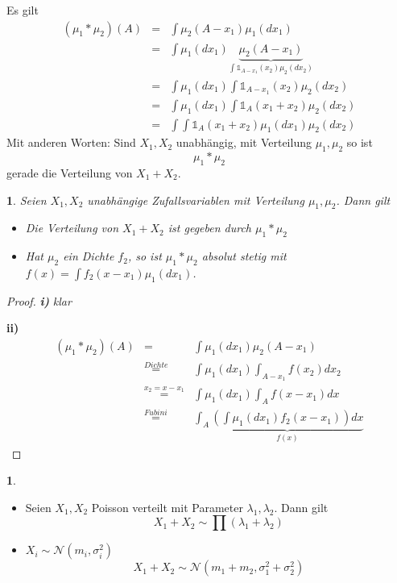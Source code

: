 \documentclass[10pt,a4paper]{report}
\numberwithin{equation}{section}
\numberwithin{figure}{section}
\theoremstyle{plain}
\theoremstyle{definition}
\newtheorem{example}[thm]{\protect\examplename}
\theoremstyle{remark}
\theoremstyle{plain}
\newtheorem{prop}[thm]{\protect\propositionname}
\providecommand{\examplename}{Beispiel}
\providecommand{\propositionname}{Satz}
\newcommand{\1}{ \mathbb{1} } %
\begin{document}
Es gilt
\begin{eqnarray*}
  \left(\mu_{1}*\mu_{2}\right)\left(A\right) & = & \int\mu_{2}\left(A-x_{1}\right)\mu_{1}\left(dx_{1}\right)\\
  & = & \int\mu_{1}\left(dx_{1}\right)\underset{\int\1_{A-x_{1}}\left(x_{2}\right)\mu_{2}\left(dx_{2}\right)}{\underbrace{\mu_{2}\left(A-x_{1}\right)}}\\
  & = & \int\mu_{1}\left(dx_{1}\right)\int\1_{A-x_{1}}\left(x_{2}\right)\mu_{2}\left(dx_{2}\right)\\
  & = & \int\mu_{1}\left(dx_{1}\right)\int\1_{A}\left(x_{1}+x_{2}\right)\mu_{2}\left(dx_{2}\right)\\
  & = & \int\int\1_{A}\left(x_{1}+x_{2}\right)\mu_{1}\left(dx_{1}\right)\mu_{2}\left(dx_{2}\right)
\end{eqnarray*}
Mit anderen Worten: Sind $X_{1},X_{2}$ unabhängig, mit Verteilung
$\mu_{1},\mu_{2}$ so ist 
\[
\mu_{1}*\mu_{2}
\]
gerade die Verteilung von $X_{1}+X_{2}$\@.
\begin{prop} %
  Seien $X_{1},X_{2}$ unabhängige Zufallsvariablen mit Verteilung $\mu_{1},\mu_{2}$.
  Dann gilt
  \begin{itemize}
  \item [{i)}] Die Verteilung von $X_{1}+X_{2}$ ist gegeben durch $\mu_{1}*\mu_{2}$
  \item [{ii)}] Hat $\mu_{2}$ ein Dichte $f_{2}$, so ist $\mu_{1}*\mu_{2}$
    absolut stetig mit $f\left(x\right)=\int f_{2}\left(x-x_{1}\right)\mu_{1}\left(dx_{1}\right)$. 
  \end{itemize}
\end{prop}
\begin{proof}
  \textbf{\textit{i)}}\textit{ klar}

  \textbf{ii)} 
  \begin{eqnarray*}
    \left(\mu_{1}*\mu_{2}\right)\left(A\right) & = & \int\mu_{1}\left(dx_{1}\right)\mu_{2}\left(A-x_{1}\right)\\
    & \overset{Dichte}{=} & \int\mu_{1}\left(dx_{1}\right)\int_{A-x_{1}}f\left(x_{2}\right)dx_{2}\\
    & \overset{x_{2}=x-x_{1}}{=} & \int\mu_{1}\left(dx_{1}\right)\int_{A}f\left(x-x_{1}\right)dx\\
    & \overset{Fubini}{=} & \int_{A}\underset{f\left(x\right)}{\underbrace{\left(\int\mu_{1}\left(dx_{1}\right)f_{2}\left(x-x_{1}\right)\right)dx}}
  \end{eqnarray*}
\end{proof}
\begin{example}
  \ 
  \begin{itemize}
  \item [{i)}] Seien $X_{1},X_{2}$ Poisson verteilt mit Parameter $\lambda_{1},\lambda_{2}$.
    Dann gilt
    \[
    X_{1}+X_{2}\sim\prod\left(\lambda_{1}+\lambda_{2}\right)
    \]

  \item [{ii)}] $X_{i}\sim\mathcal{N}\left(m_{i},\sigma_{i}^{2}\right)$
    \[
    X_{1}+X_{2}\sim\mathcal{N}\left(m_{1}+m_{2},\sigma_{1}^{2}+\sigma_{2}^{2}\right)
    \]
    
  \end{itemize}
\end{example}
\end{document}
